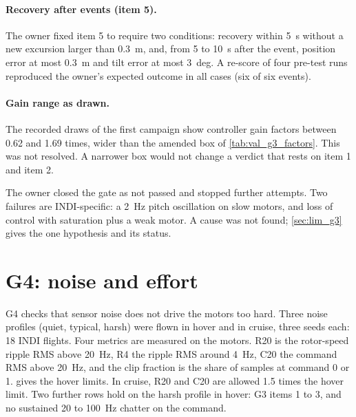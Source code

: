 \paragraph{Recovery after events (item 5).}
The owner fixed item 5 to require two conditions: recovery within 5~s without a new excursion larger than 0.3~m, and, from 5 to 10~s after the event, position error at most 0.3~m and tilt error at most 3~deg.
A re-score of four pre-test runs reproduced the owner's expected outcome in all cases (six of six events).

\paragraph{Gain range as drawn.}
The recorded draws of the first campaign show controller gain factors between 0.62 and 1.69 times, wider than the amended box of \cref{tab:val_g3_factors}.
This was not resolved.
A narrower box would not change a verdict that rests on item 1 and item 2.


\begin{keyresult}
The owner closed the gate as not passed and stopped further attempts.
Two failures are INDI-specific: a 2~Hz pitch oscillation on slow motors, and loss of control with saturation plus a weak motor.
A cause was not found; \cref{sec:lim_g3} gives the one hypothesis and its status.
\end{keyresult}

\section{G4: noise and effort}\label{sec:val_g4}

G4 checks that sensor noise does not drive the motors too hard.
Three noise profiles (quiet, typical, harsh) were flown in hover and in cruise, three seeds each: 18 INDI flights.
Four metrics are measured on the motors.
R20 is the rotor-speed ripple RMS above 20~Hz, R4 the ripple RMS around 4~Hz, C20 the command RMS above 20~Hz, and the clip fraction is the share of samples at command 0 or 1.
 gives the hover limits.
In cruise, R20 and C20 are allowed 1.5 times the hover limit.
Two further rows hold on the harsh profile in hover: G3 items 1 to 3, and no sustained 20 to 100~Hz chatter on the command.

